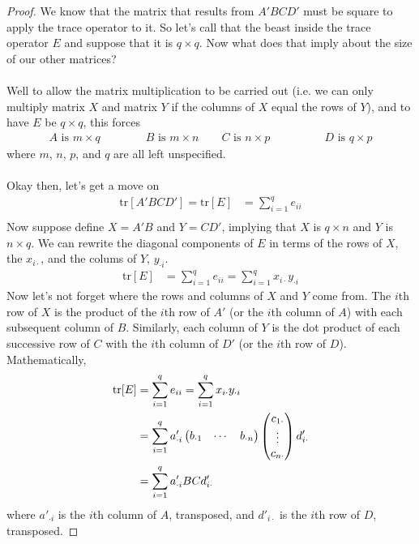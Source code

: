 \documentclass[a4paper,12pt]{scrartcl}
\begin{document}
\begin{proof} We know that the matrix that results from 
$A'BCD'$ must be square to
apply the trace operator to it.  So let's call that the beast 
inside the trace operator $E$ and suppose that it is
$q \times q$. Now what does that imply about the size of our
other matrices? 
\\
\\
Well to allow the matrix multiplication to 
be carried out (i.e. we can only multiply matrix $X$ and
matrix $Y$ if the columns of $X$ equal the rows of $Y$), 
and to have $E$ be $q\times q$, this forces
\begin{align*}
    A \text{ is } m \times q \qquad 
	 \qquad B \text{ is } m \times n \qquad
    C \text{ is } n \times p \qquad 
	& \qquad
    D \text{ is } q \times p
\end{align*}
where $m$, $n$, $p$, and $q$ are all left unspecified.
\\
\\
Okay then, let's get a move on
\begin{align*}
    \text{tr}[A'BCD'] = \text{tr}[E] &= 
	\sum^q_{i=1} e_{ii} \\
\end{align*}
Now suppose define $X = A'B$ and $Y = CD'$, implying
that $X$ is $q\times n$ and $Y$ is $n\times q$.
We can rewrite the diagonal components of $E$ in 
terms of the rows of $X$, the $x_{i\cdot}$, and 
the colums of $Y$, $y_{\cdot i}$.
\begin{align*}
    \text{tr}[E] &= 
	\sum^q_{i=1} e_{ii} 
	= \sum^q_{i=1} x_{i\cdot} y_{\cdot i}
\end{align*}
Now let's not forget where the rows and columns of 
$X$ and $Y$ come from. The $i$th row of $X$ is 
the product of the $i$th row of $A'$ (or the $i$th
column of $A$) with 
each subsequent column of $B$. Similarly, each
column of $Y$ is the dot product of each 
successive row of $C$ with the $i$th column of $D'$
(or the $i$th row of $D$).
Mathematically, 
\begin{align}
    \text{tr}[E] &= 
	\sum^q_{i=1} e_{ii} 
	= \sum^q_{i=1} x_{i\cdot} y_{\cdot i} \notag \\
    &= \sum^q_{i=1} a'_{\cdot i} 
	\begin{pmatrix} b_{\cdot 1} & \cdots & b_{\cdot n}
	\end{pmatrix}
	\begin{pmatrix} c_{1\cdot} \\ \vdots \\ c_{n \cdot}
	\end{pmatrix} 
	d'_{i \cdot} \label{fullrep} \\
    &= \sum^q_{i=1} a'_{\cdot i} 
	BC
	d'_{i \cdot} \label{simprep} 
\end{align}
where $a'_{\cdot i}$ is the $i$th column of $A$,
transposed, and $d'_{i \cdot}$ is the $i$th row of $D$,
transposed.


\end{proof}
\end{document}
